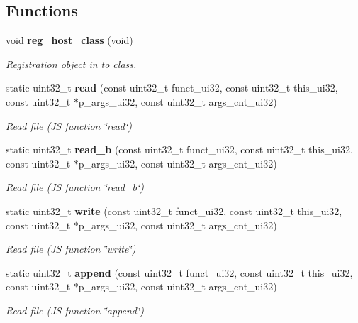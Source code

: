 \subsection*{Functions}
\begin{DoxyCompactItemize}
\item 
void \textbf{ reg\+\_\+host\+\_\+class} (void)
\begin{DoxyCompactList}\small\item\em Registration object in to class. \end{DoxyCompactList}\item 
static uint32\+\_\+t \textbf{ read} (const uint32\+\_\+t funct\+\_\+ui32, const uint32\+\_\+t this\+\_\+ui32, const uint32\+\_\+t $\ast$p\+\_\+args\+\_\+ui32, const uint32\+\_\+t args\+\_\+cnt\+\_\+ui32)
\begin{DoxyCompactList}\small\item\em Read file (JS function \char`\"{}read\char`\"{}) \end{DoxyCompactList}\item 
static uint32\+\_\+t \textbf{ read\+\_\+b} (const uint32\+\_\+t funct\+\_\+ui32, const uint32\+\_\+t this\+\_\+ui32, const uint32\+\_\+t $\ast$p\+\_\+args\+\_\+ui32, const uint32\+\_\+t args\+\_\+cnt\+\_\+ui32)
\begin{DoxyCompactList}\small\item\em Read file (JS function \char`\"{}read\+\_\+b\char`\"{}) \end{DoxyCompactList}\item 
static uint32\+\_\+t \textbf{ write} (const uint32\+\_\+t funct\+\_\+ui32, const uint32\+\_\+t this\+\_\+ui32, const uint32\+\_\+t $\ast$p\+\_\+args\+\_\+ui32, const uint32\+\_\+t args\+\_\+cnt\+\_\+ui32)
\begin{DoxyCompactList}\small\item\em Read file (JS function \char`\"{}write\char`\"{}) \end{DoxyCompactList}\item 
static uint32\+\_\+t \textbf{ append} (const uint32\+\_\+t funct\+\_\+ui32, const uint32\+\_\+t this\+\_\+ui32, const uint32\+\_\+t $\ast$p\+\_\+args\+\_\+ui32, const uint32\+\_\+t args\+\_\+cnt\+\_\+ui32)
\begin{DoxyCompactList}\small\item\em Read file (JS function \char`\"{}append\char`\"{}) \end{DoxyCompactList}\end{DoxyCompactItemize}


